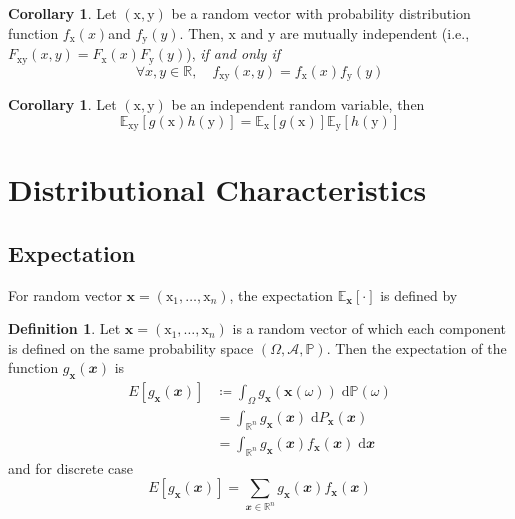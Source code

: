 \documentclass[twoside]{article}
\theoremstyle{definition}
\newtheorem{definition}{Definition}[section]
\newtheorem{corollary}[theorem]{Corollary}
\theoremstyle{remark}
\theoremstyle{remark}
\begin{document}
\begin{corollary}
  Let $(\mathrm{x}, \mathrm{y})$ be a random vector with probability distribution
  function $f_\mathrm{x}(x)$and $f_\mathrm{y}(y)$. Then, $\mathrm{x}$ and $\mathrm{y}$
  are mutually independent (i.e., $F_{\mathrm{xy}}(x, y) = F_\mathrm{x}(x) F_\mathrm{y}(y)$),
  \textit{if and only if}
  \begin{equation}
    \forall x, y \in \mathbb{R}, \quad f_{\mathrm{xy}}(x, y) = f_{\mathrm{x}}(x) f_\mathrm{y}(y)
  \end{equation}
\end{corollary}

\begin{corollary}
  Let $(\mathrm{x}, \mathrm{y})$ be an independent random variable, then
  \begin{equation}
    \mathbb{E}_\mathrm{xy}[g(\mathrm{x})h(\mathrm{y})]
    = \mathbb{E}_\mathrm{x}[g(\mathrm{x})]
      \mathbb{E}_\mathrm{y}[h(\mathrm{y})]
  \end{equation}
\end{corollary}

\section{Distributional Characteristics}

\subsection{Expectation}
For random vector $\mathbf{x} = (\mathrm{x}_1, \ldots, \mathrm{x}_n)$, the
expectation $\mathbb{E}_{\mathbf{x}}[\cdot]$ is defined by
\begin{definition}
  Let $\mathbf{x} = (\mathrm{x}_1, \ldots, \mathrm{x}_n)$ is a random vector
  of which each component is defined on the same probability space $(\Omega, \mathcal{A},
  \mathbb{P})$. Then the expectation of the function $g_\mathbf{x}(\mathbfit{x})$
  is
  \begin{equation}
    \begin{split}
      E[g_\mathbf{x}(\mathbfit{x})]
      & \coloneqq \int_\Omega g_\mathbf{x}(\mathbf{x}(\omega)) \;\mathrm{d}\mathbb{P}(\omega) \\
      & = \int_{\mathbb{R}^n} g_\mathbf{x}(\mathbfit{x}) \;\mathrm{d}P_{\mathbf{x}}(\mathbfit{x}) \\
      & = \int_{\mathbb{R}^n} g_\mathbf{x}(\mathbfit{x}) f_\mathbf{x}(\mathbfit{x}) \;\mathrm{d}\mathbfit{x}
    \end{split}
  \end{equation}
  and for discrete case
  \begin{equation}
    E[g_\mathbf{x}(\mathbfit{x})] = \sum_{\mathbfit{x} \in \mathbb{R}^n} g_\mathbf{x}(\mathbfit{x}) f_\mathbf{x}(\mathbfit{x})
  \end{equation}
\end{definition}
\end{document}
